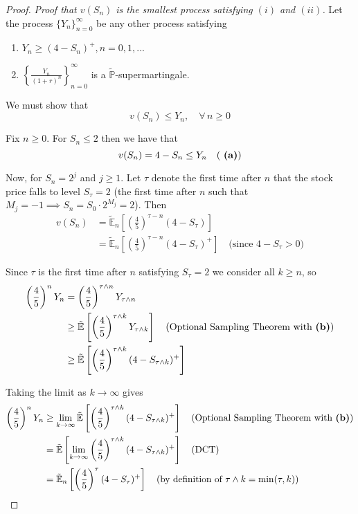 \documentclass[12pt]{article}
\newlength\tindent
\renewcommand{\indent}{\hspace*{\tindent}}
\renewcommand{\P}{\mathbb P}
\newcommand{\E}{\mathbb E}
\begin{document}
\begin{proof} {\em Proof that $v(S_n)$ is the smallest process satisfying $(i)$ and $(ii)$.} Let the process $\{Y_n\}^\infty_{n = 0}$ be any other process satisfying
\begin{enumerate}[\bf (a)]
	\item $Y_n \geq (4 - S_n)^+, n = 0,1,...$
	\item $\left\{ \frac{ Y_n }{ (1 + r)^n } \right\}^\infty_{n = 0}$ is a $\tilde{\P}$-supermartingale.
\end{enumerate}

We must show that
\begin{equation*}
	v(S_n) \leq Y_n, \quad \forall\,n\geq 0
\end{equation*}

Fix $n \geq 0$. For $S_n \leq 2$ then we have that
\begin{equation*}
	v(S_n) = 4 - S_n \leq Y_n \quad \text{( {\bf (a)})}
\end{equation*}

\indent Now, for $S_n = 2^j$ and $j \geq 1$. Let $\tau$ denote the first time after $n$ that the stock price falls to level $S_\tau = 2$ (the first time after $n$ such that $M_j = -1 \implies S_n = S_0 \cdot 2^{M_j} = 2$). Then
\begin{align*}
	v(S_n) &= \tilde{\E}_n \left[ \left( \frac{4}{5} \right)^{\tau - n} (4 - S_\tau) \right] \\
	&= \tilde{\E}_n \left[ \left( \frac{4}{5} \right)^{\tau - n} (4 - S_\tau)^+ \right] \quad \text{(since $4 - S_\tau > 0$)}
\end{align*}

Since $\tau$ is the first time after $n$ satisfying $S_\tau = 2$ we consider all $k \geq n$, so
\begin{align*}
	\left( \frac{4}{5} \right)^n Y_n &= \left( \frac{4}{5} \right)^{\tau\land n} Y_{\tau\land n} \\
	&\geq \tilde{\E} \left[ \left( \frac{4}{5} \right)^{\tau\land k} Y_{\tau\land k} \right] \quad \text{(Optional Sampling Theorem with {\bf (b)})} \\
	&\geq \tilde{\E} \left[ \left( \frac{4}{5} \right)^{\tau\land k} (4 - S_{\tau\land k})^+ \right]
\end{align*}

Taking the limit as $k\to\infty$ gives 
\begin{align*}
	\left( \frac{4}{5} \right)^n Y_n &\geq \lim_{k\to\infty} \tilde{\E} \left[ \left( \frac{4}{5} \right)^{\tau\land k} (4 - S_{\tau\land k})^+ \right] \quad \text{(Optional Sampling Theorem with {\bf (b)})} \\
	&= \tilde{\E} \left[ \lim_{k\to\infty} \left( \frac{4}{5} \right)^{\tau\land k} (4 - S_{\tau\land k})^+ \right] \quad \text{(DCT)} \\
	&= \tilde{\E}_n \left[ \left( \frac{4}{5} \right)^\tau (4 - S_\tau)^+ \right] \quad \text{(by definition of $\tau\land k = \min (\tau, k)$)}
\end{align*}


\end{proof}
\end{document}
